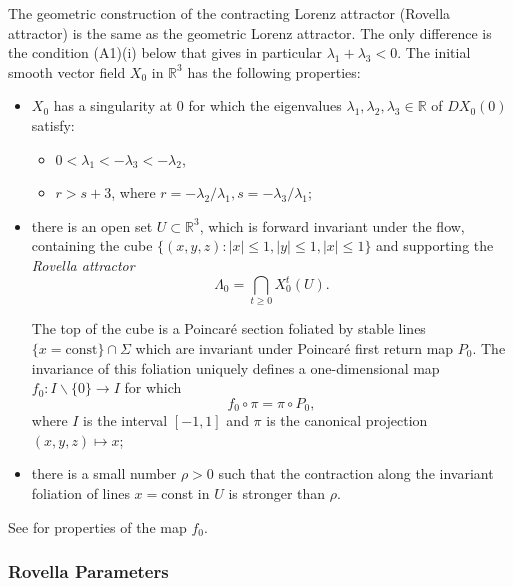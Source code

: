 \documentclass[12pt,a4paper]{amsart}
\theoremstyle{plain}
\begin{document}
The geometric construction of the contracting Lorenz attractor (Rovella attractor) is the same as the geometric Lorenz attractor. The only difference is the condition
(A1)(i) below that gives in particular $\lambda_{1} + \lambda_{3} < 0$. The initial smooth vector field $X_{0}$ in $\mathbb{R}^{3}$ has the following properties:

\begin{itemize}
	
	\item[(A1)] $X_{0}$ has a singularity at $0$ for which the eigenvalues $\lambda_{1},\lambda_{2},\lambda_{3} \in \mathbb{R}$ of $DX_{0}(0)$ satisfy:
	\begin{itemize}
		
		\item[(i)] $0 < \lambda_{1} < -\lambda_{3}  < -\lambda_{2}$,
		
		\item[(ii)] $r > s+3$, where $r=-\lambda_{2}/\lambda_{1}, s=-\lambda_{3}/\lambda_{1}$;
	\end{itemize}
	
	\item[(A2)] there is an open set $U \subset \mathbb{R}^{3}$, which is forward invariant under the flow, containing the cube
	$\{(x,y,z) : \mid x \mid \leq 1, \mid y \mid \leq 1, \mid x \mid \leq 1\}$ and supporting the \textit{Rovella attractor}
	\[
	\displaystyle \Lambda_{0} = \bigcap_{t \geq 0} X_{0}^{t}(U).
	\]
	
	The top of the cube is a Poincar\'e section foliated by stable lines $\{x = \text{const}\} \cap \Sigma$ which are invariant under Poincar\'e first return map $P_{0}$.
	The invariance of this foliation uniquely defines a one-dimensional map $f_{0} : I \backslash \{0\} \to I$ for which
	\[
	f_{0} \circ \pi = \pi \circ P_{0},
	\]
	where $I$ is the interval $[-1,1]$ and $\pi$ is the canonical projection $(x,y,z) \mapsto x$;
	
	\item[(A3)] there is a small number $\rho >0$ such that the contraction along the invariant foliation of lines $x =$const in $U$ is stronger than $\rho$.
\end{itemize}

See \cite{AS} for properties of the map $f_{0}$.

\subsubsection{Rovella Parameters}
\end{document}
